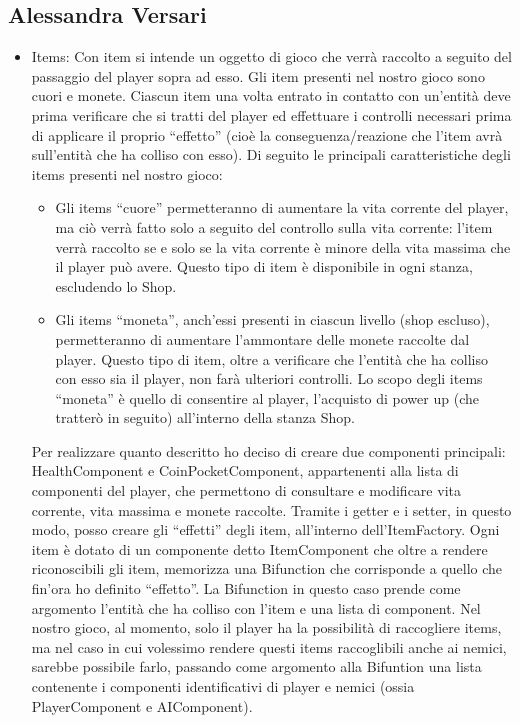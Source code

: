 \documentclass[a4paper,12pt]{report}
\begin{document}
\subsection{Alessandra Versari}
\begin{itemize}
	\item Items: Con item si intende un oggetto di gioco che verrà raccolto a seguito del passaggio del player sopra ad esso. Gli item presenti nel nostro gioco sono cuori e monete.
	Ciascun item una volta entrato in contatto con un'entità deve prima verificare che si tratti del player ed effettuare i controlli necessari prima di applicare il proprio “effetto” (cioè la conseguenza/reazione che l'item avrà sull'entità che ha colliso con esso).
	Di seguito le principali caratteristiche degli items presenti nel nostro gioco:
	\begin{itemize}
		\item Gli items “cuore” permetteranno di aumentare la vita corrente del player, ma ciò verrà fatto solo a seguito del controllo sulla vita corrente: l'item verrà raccolto se e solo se la vita corrente è minore della vita massima che il player può avere. Questo tipo di item è disponibile in ogni stanza, escludendo lo Shop.
		\item Gli items “moneta”, anch'essi presenti in ciascun livello (shop escluso), permetteranno di aumentare l'ammontare delle monete raccolte dal player. Questo tipo di item, oltre a verificare che l'entità che ha colliso con esso sia il player, non farà ulteriori controlli. Lo scopo degli items “moneta” è quello di consentire al player, l'acquisto di power up (che tratterò in seguito) all'interno della stanza Shop.
	\end{itemize}
	Per realizzare quanto descritto ho deciso di creare due componenti principali: HealthComponent e CoinPocketComponent, appartenenti alla lista di componenti del player, che permettono di consultare e modificare vita corrente, vita massima e monete raccolte. Tramite i getter e i setter, in questo modo, posso creare gli “effetti” degli item, all'interno dell'ItemFactory. 
	Ogni item è dotato di un componente detto ItemComponent che oltre a rendere riconoscibili gli item, memorizza una Bifunction che corrisponde a quello che fin'ora ho definito “effetto”. La Bifunction in questo caso prende come argomento l'entità che ha colliso con l'item e una lista di component. Nel nostro gioco, al momento, solo il player ha la possibilità di raccogliere items, ma nel caso in cui volessimo rendere questi items raccoglibili anche ai nemici, sarebbe possibile farlo, passando come argomento alla Bifuntion una lista contenente i componenti identificativi di player e nemici (ossia PlayerComponent e AIComponent).

\end{itemize}
\end{document}
